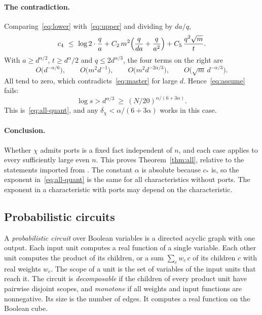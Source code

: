 \documentclass[11pt]{article}
\theoremstyle{remark}
\begin{document}
\paragraph{The contradiction.}
Comparing~\eqref{eq:lower} with~\eqref{eq:upper} and dividing by
\(da/q\),
\begin{equation}\label{eq:master}
 c_4\ \le\ \log2\cdot\frac qa
   +C_2\,m^2\Bigl(\frac q{da}+\frac q{a^2}\Bigr)
   +C_5\,\frac{q^2\sqrt m}{t}.
\end{equation}
With \(a\ge d^{\alpha/2}\), \(t\ge d^\alpha/2\) and
\(q\le2d^{\alpha/3}\), the four terms on the right are
\[
 O\bigl(d^{-\alpha/6}\bigr),\qquad O\bigl(m^2d^{-1}\bigr),\qquad
 O\bigl(m^2d^{-2\alpha/3}\bigr),\qquad O\bigl(\sqrt m\,d^{-\alpha/3}\bigr).
\]
All tend to zero, which contradicts~\eqref{eq:master} for large \(d\).
Hence~\eqref{eq:assume} fails:
\[
 \log s>d^{\alpha/3}\ \ge\ (N/20)^{\alpha/(6+3\alpha)} .
\]
This is~\eqref{eq:all-quant}, and any
\(\delta_\chi<\alpha/(6+3\alpha)\) works in this case.

\paragraph{Conclusion.}
Whether \(\chi\) admits ports is a fixed fact independent of \(n\), and
each case applies to every sufficiently large even \(n\). This proves
Theorem~\ref{thm:all}, relative to the statements imported from
\cite{hc}. The constant \(\alpha\) is absolute because \(c_*\) is, so
the exponent in~\eqref{eq:all-quant} is the same for all characteristics
without ports. The exponent in a characteristic with ports may depend on
the characteristic.

\subsection{Probabilistic circuits}\label{sec:prob-sim}
A \emph{probabilistic circuit} over Boolean variables is a directed
acyclic graph with one output. Each input unit computes a real function
of a single variable. Each other unit computes the product of its
children, or a sum \(\sum_cw_c\,c\) of its children \(c\) with real
weights \(w_c\). The scope of a unit is the set of variables of the input
units that reach it. The circuit is \emph{decomposable} if the children
of every product unit have pairwise disjoint scopes, and \emph{monotone}
if all weights and input functions are nonnegative. Its size is the
number of edges. It computes a real function on the Boolean cube.
\end{document}
